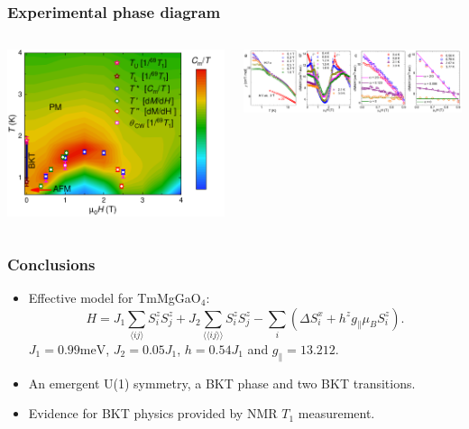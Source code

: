 \documentclass[xcolor=table, aspectratio=1610,ignorenonframetext]{beamer}
\begin{document}
\begin{frame}
  \frametitle{Experimental phase diagram}
  \begin{columns}
    \begin{center}
      \includegraphics[width=\textwidth]{pd-hz-exp}
    \end{center}
    \begin{center}
      \includegraphics[width=.8\textwidth]{chi}
    \end{center}
  \end{columns}
\end{frame}

\begin{frame}
  \frametitle{Conclusions}
  \begin{itemize}
    \item Effective model for TmMgGaO${}_4$:
    \[H = J_1\sum_{\langle ij\rangle}S_i^zS_j^z +J_2\sum_{\langle\langle ij\rangle\rangle}S_i^zS_j^z - \sum_i\left(\Delta S_i^x + h^zg_\parallel\mu_BS_i^z\right). \]
    $J_1 = 0.99 \text{meV}$, $J_2 = 0.05J_1$,  $h= 0.54J_1$ and $g_\parallel = 13.212$.
    \item An emergent U(1) symmetry, a BKT phase and two BKT transitions.
    \item Evidence for BKT physics provided by NMR $T_1$ measurement.
  \end{itemize}
\end{frame}
\end{document}
